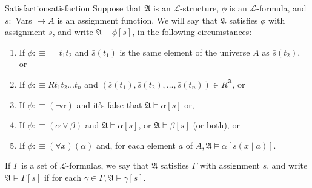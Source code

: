 \begin{definition}{Satisfaction}{satisfaction}
Suppose that $\mathfrak{A}$ is an $\mathcal{L}$-structure, $\phi$ is an $\mathcal{L}$-formula, and $s:$ Vars $\rightarrow A$ is an assignment function. We will say that $\mathfrak{A}$ satisfies $\phi$ with assignment $s$, and write $\mathfrak{A} \models \phi[s]$, in the following circumstances:
\begin{enumerate}
    \item If $\phi: \equiv=t_{1} t_{2}$ and $\bar{s}\left(t_{1}\right)$ is the same element of the universe $A$ as $\bar{s}\left(t_{2}\right)$, or
    \item If $\phi: \equiv R t_{1} t_{2} \ldots t_{n}$ and $\left(\bar{s}\left(t_{1}\right), \bar{s}\left(t_{2}\right), \ldots, \bar{s}\left(t_{n}\right)\right) \in R^{\mathfrak{A}}$, or
    \item If $\phi: \equiv(\neg \alpha)$ and it's false that $\mathfrak{A} \models \alpha[s]$ or,
    \item If $\phi: \equiv(\alpha \vee \beta)$ and $\mathfrak{A} \models \alpha[s]$, or $\mathfrak{A} \models \beta[s]$ (or both), or
    \item If $\phi: \equiv(\forall x)(\alpha)$ and, for each element $a$ of $A, \mathfrak{A} \models \alpha[s(x \mid a)]$.
\end{enumerate}

If $\Gamma$ is a set of $\mathcal{L}$-formulas, we say that $\mathfrak{A}$ satisfies $\Gamma$ with assignment $s$, and write $\mathfrak{A} \models \Gamma[s]$ if for each $\gamma \in \Gamma, \mathfrak{A} \models \gamma[s]$.
\end{definition}
